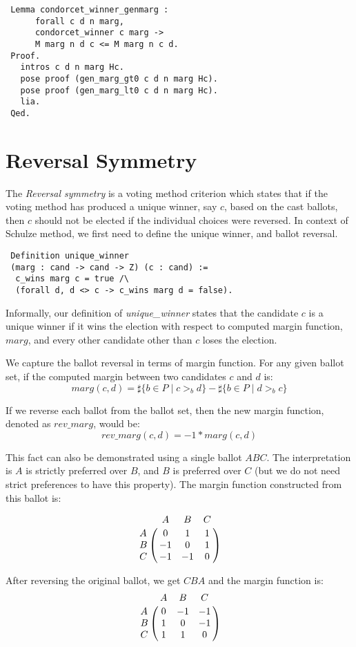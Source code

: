 \begin{verbatim}
 Lemma condorcet_winner_genmarg :
      forall c d n marg, 
      condorcet_winner c marg -> 
      M marg n d c <= M marg n c d.  
 Proof.
   intros c d n marg Hc.
   pose proof (gen_marg_gt0 c d n marg Hc).
   pose proof (gen_marg_lt0 c d n marg Hc).
   lia.
 Qed.
\end{verbatim}
   
\section{Reversal Symmetry}
 The \textit{Reversal symmetry} is a voting method criterion which states that if the voting method has produced a unique 
 winner, say $c$, based on the cast ballots, then $c$ should not be elected if the individual choices were 
 reversed. In context of Schulze method, we first need to define the unique winner, and ballot reversal. 
 
 \begin{verbatim}
 Definition unique_winner 
 (marg : cand -> cand -> Z) (c : cand) :=
  c_wins marg c = true /\
  (forall d, d <> c -> c_wins marg d = false).
\end{verbatim}  

Informally, our definition of \textit{unique\_winner} states that the candidate $c$ is a unique winner
if it wins the election with respect to computed margin function, $marg$, and every other candidate 
other than $c$ loses the election. 

We capture the ballot reversal in terms of margin function. For any given ballot set, if the computed 
margin between two candidates $c$ and $d$ is: 
\[
  marg(c, d) = \sharp \lbrace b \in P \mid c >_b d \rbrace -
            \sharp \lbrace b \in P \mid d >_b c \rbrace
\] 

If we reverse each ballot from the ballot set, then the new margin function, denoted as $rev\_marg$, would be:
\[
  rev\_marg(c, d) = -1 * marg (c, d)
\] 

This fact can also be demonstrated using a single ballot $ABC$. The interpretation is $A$ is strictly preferred over $B$, 
and $B$ is preferred over $C$ (but we do not need strict preferences to have this property). 
The margin function constructed from this ballot is: 

\[
\bordermatrix{ & A & B & C \cr
      A & 0 & 1 & 1 \cr
      B & -1 & 0 & 1 \cr
      C & -1 & -1 & 0 }
      \]
      
After reversing the original ballot, we get $CBA$ and the margin function is:
\[
\bordermatrix{ & A & B & C \cr
      A & 0 & -1 & -1 \cr
      B & 1 & 0 & -1 \cr
      C & 1 & 1 & 0 }
      \]

